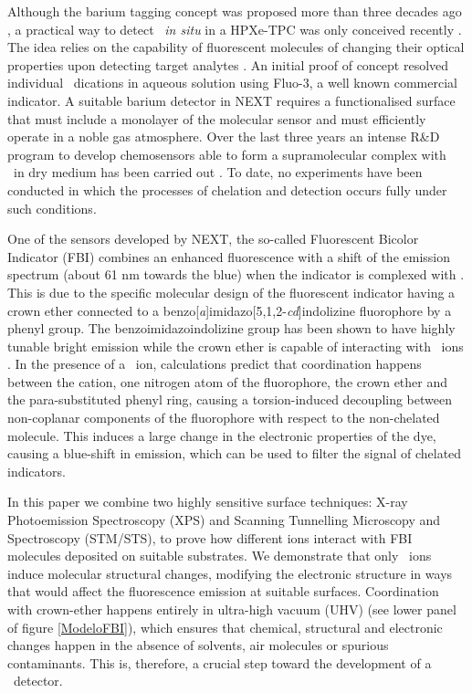 \documentclass[aps,prl,reprint,longbibliography,superscriptaddress, english]{revtex4-1}
\begin{document}
Although the barium tagging concept was proposed more than three decades ago \cite{Moe:1991ik}, a practical way to detect \Bapp\ {\it in situ} in a HPXe-TPC was only conceived recently \cite{Nygren_2015, Jones:2016qiq}. The idea relies on the capability of fluorescent molecules of changing their optical properties upon detecting target analytes \cite{valeur_chemical,wolfbeis_materials_2005}. An initial proof of concept \cite{McDonald:2017izm} resolved individual \Bapp\ dications in aqueous solution using Fluo-3, a well known commercial indicator. A suitable barium detector in NEXT requires a functionalised surface that must include a monolayer of the molecular sensor and must efficiently operate in a noble gas atmosphere. Over the last three years an intense R\&D program to develop chemosensors able to form a supramolecular complex with \Bapp\ in dry medium has been carried out \cite{Thapa:2019zjk, rivilla_fluorescent_2020,thapa_demonstration_2021}. To date, no experiments have been conducted in which the processes of chelation and detection occurs fully under such conditions.

One of the sensors developed by NEXT, the so-called
Fluorescent Bicolor Indicator (FBI) \cite{rivilla_fluorescent_2020} combines an enhanced fluorescence with a shift of the emission spectrum (about 61 nm towards the blue) when the indicator is complexed with \Bapp.  This is due to the specific molecular design of the fluorescent indicator having a crown ether connected to a benzo[\textit{a}]imidazo[5,1,2-\textit{cd}]indolizine fluorophore by a phenyl group. The benzoimidazoindolizine group has been shown to have highly tunable bright emission \cite{Stasyuk_benzo,Levesque_general} while the crown ether is capable of interacting with \Bapp\ ions \cite{valeur_chemical,maleknia_cavity-size-dependent_2002}. In the presence of a \Bapp\ ion, calculations predict that coordination happens between the cation, one nitrogen atom of the fluorophore, the crown ether and the para-substituted phenyl ring, causing a  {torsion-induced decoupling between non-coplanar components of the fluorophore with respect} to the non-chelated molecule. This induces a large change in the electronic properties of the dye, causing a blue-shift in emission, which can be used to filter the signal of chelated indicators.

In this paper we combine two highly sensitive surface techniques: X-ray Photoemission Spectroscopy (XPS) and Scanning Tunnelling Microscopy and Spectroscopy (STM/STS), to prove how different ions interact with FBI molecules deposited on suitable substrates. We demonstrate that only \Bapp\ ions induce molecular structural changes, modifying the electronic structure in ways that would affect the fluorescence emission at suitable surfaces. Coordination with crown-ether happens entirely in ultra-high vacuum (UHV) (see lower panel of figure {\ref{ModeloFBI}}), which ensures that chemical, structural and electronic changes happen in the absence of solvents, air molecules or spurious contaminants. This is, therefore, a crucial step toward the development of a \Bapp\ detector. 
\end{document}
